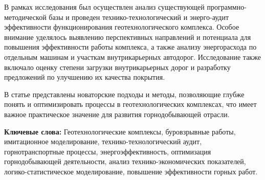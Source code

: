 В рамках исследования был осуществлен анализ существующей
программно-методической базы и проведен технико-технологический и
энерго-аудит эффективности функционирования геотехнологического
комплекса. Особое внимание уделялось выявлению перспективных направлений
и потенциала для повышения эффективности работы комплекса, а также
анализу энергорасхода по отдельным машинам и участкам внутрикарьерных
автодорог. Исследование также включало оценку степени загрузки
внутрикарьерных дорог и разработку предложений по улучшению их качества
покрытия.

В статье представлены новаторские подходы и методы, позволяющие глубже
понять и оптимизировать процессы в геотехнологических комплексах, что
имеет важное практическое значение для развития горнодобывающей отрасли.

{\bfseries Ключевые слова:} Геотехнологические комплексы, буровзрывные
работы, имитационное моделирование, технико-технологический аудит,
горнотранспортные процессы, энергоэффективность, оптимизация
горнодобывающей деятельности, анализ технико-экономических показателей,
логико-статистическое моделирование, повышение эффективности горных
работ.

